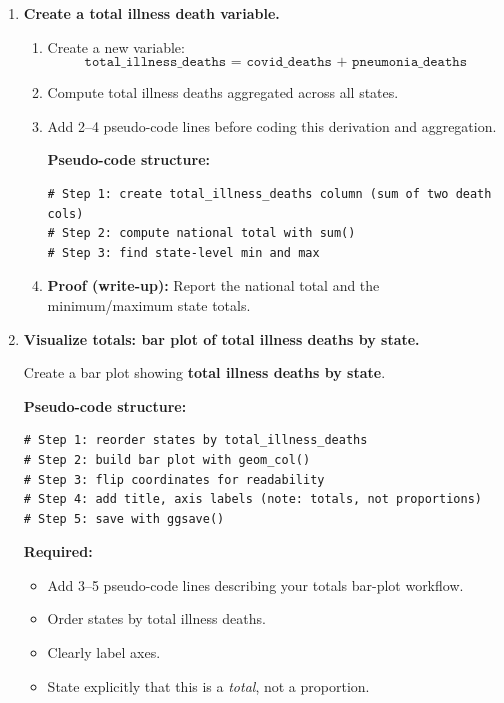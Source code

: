 \documentclass[11pt]{article}
\begin{document}
\begin{enumerate}
\begin{enumerate}
    \textbf{Suggested edit:} Use \texttt{dim(df)}, \texttt{names(df)}, and a focused summary of vote and death variables.
    \item \textbf{Proof (write-up):} Report:
    \begin{itemize}
      \item number of rows and columns,
      \item the range of \texttt{totalvotes},
      \item the range of \texttt{covid\_deaths\_to\_2020\_11\_07}.
    \end{itemize}
  \end{enumerate}

  \item \textbf{Create a total illness death variable.}
  \begin{enumerate}
    \item Create a new variable:
    \[
      \texttt{total\_illness\_deaths = covid\_deaths + pneumonia\_deaths}
    \]
    \item Compute total illness deaths aggregated across all states.
    \item Add 2--4 pseudo-code lines before coding this derivation and aggregation.

    \textbf{Pseudo-code structure:}
\begin{verbatim}
# Step 1: create total_illness_deaths column (sum of two death cols)
# Step 2: compute national total with sum()
# Step 3: find state-level min and max
\end{verbatim}
    \item \textbf{Proof (write-up):} Report the national total and the minimum/maximum state totals.
  \end{enumerate}

  \item \textbf{Visualize totals: bar plot of total illness deaths by state.}

  Create a bar plot showing \textbf{total illness deaths by state}.

  \medskip
  \noindent \textbf{Pseudo-code structure:}
\begin{verbatim}
# Step 1: reorder states by total_illness_deaths
# Step 2: build bar plot with geom_col()
# Step 3: flip coordinates for readability
# Step 4: add title, axis labels (note: totals, not proportions)
# Step 5: save with ggsave()
\end{verbatim}

  \noindent \textbf{Required:}
  \begin{itemize}
    \item Add 3--5 pseudo-code lines describing your totals bar-plot workflow.
    \item Order states by total illness deaths.
    \item Clearly label axes.
    \item State explicitly that this is a \emph{total}, not a proportion.
  \end{itemize}


\end{enumerate}
\end{document}
